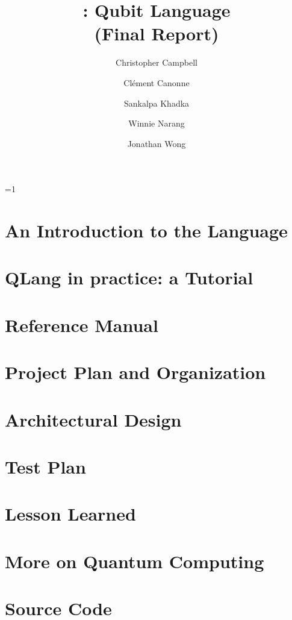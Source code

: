 \documentclass[11pt]{report}
\title{\QL: Qubit Language\\ \Large(Final Report)}
\author{
  Christopher Campbell
  \and Cl\'ement Canonne
  \and Sankalpa Khadka
  \and Winnie Narang
  \and Jonathan Wong
}
\def\withnotes{1}
\newcommand{\QL}{\textsf{QLang}\xspace}
\begin{document}
\maketitle
\tableofcontents

\ifnum\withnotes=1
  \listoftodos
\fi

\chapter{An Introduction to the Language}
  
\chapter{\QL in practice: a Tutorial}
  
\chapter{Reference Manual}\label{sec:reference}
  
\chapter{Project Plan and Organization}

\chapter{Architectural Design}
  
\chapter{Test Plan}
  
\chapter{Lesson Learned}
  
\appendix
\chapter{More on Quantum Computing}\label{app:quantum:more}
  
\chapter{Source Code}
\end{document}
